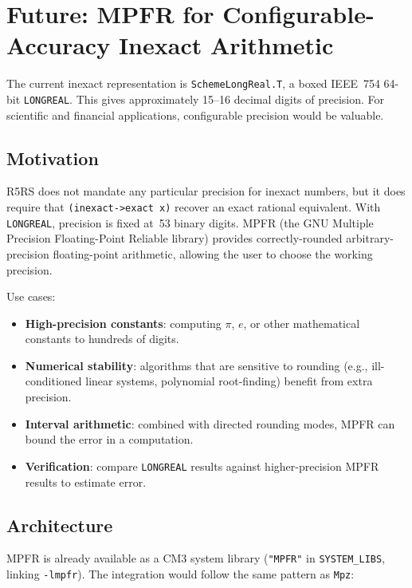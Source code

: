 \documentclass[12pt]{article}
\begin{document}
\section{Future: MPFR for Configurable-Accuracy Inexact Arithmetic}
\label{sec:mpfr}

The current inexact representation is {\tt SchemeLongReal.T}, a
boxed IEEE~754 64-bit {\tt LONGREAL}.  This gives approximately
15--16 decimal digits of precision.  For scientific and financial
applications, configurable precision would be valuable.

\subsection{Motivation}

R5RS does not mandate any particular precision for inexact
numbers, but it does require that {\tt (inexact->exact x)}
recover an exact rational equivalent.  With {\tt LONGREAL},
precision is fixed at~53 binary digits.  MPFR (the GNU
Multiple Precision Floating-Point Reliable library) provides
correctly-rounded arbitrary-precision floating-point arithmetic,
allowing the user to choose the working precision.

Use cases:
\begin{itemize}[nosep]
\item \textbf{High-precision constants}: computing $\pi$, $e$,
  or other mathematical constants to hundreds of digits.
\item \textbf{Numerical stability}: algorithms that are sensitive
  to rounding (e.g., ill-conditioned linear systems, polynomial
  root-finding) benefit from extra precision.
\item \textbf{Interval arithmetic}: combined with directed
  rounding modes, MPFR can bound the error in a computation.
\item \textbf{Verification}: compare {\tt LONGREAL} results
  against higher-precision MPFR results to estimate error.
\end{itemize}

\subsection{Architecture}

MPFR is already available as a CM3 system library ({\tt "MPFR"}
in {\tt SYSTEM\_LIBS}, linking {\tt -lmpfr}).  The integration
would follow the same pattern as {\tt Mpz}:
\end{document}
